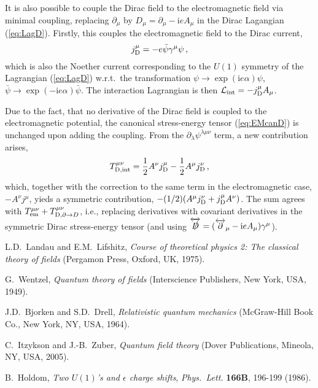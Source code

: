 \documentclass[a4paper,12pt]{article}
\def\imagi{\mathrm{i}}
\def\lag{{\mathcal{L}}}
\begin{document}
It is also possible to couple the Dirac field to the electromagnetic field via minimal coupling, replacing $\partial_\mu$ by $D_\mu = \partial_\mu -\imagi e A_\mu$ in the Dirac Lagangian (\ref{eq:LagD}). Firstly, this couples the electromagnetic field to the Dirac current,
\begin{equation}
j^\mu_{\rm D} = -e \bar{\psi}\gamma^\mu \psi\,,
\end{equation}
which is also the Noether current corresponding to the $U(1)$ symmetry of the Lagrangian (\ref{eq:LagD}) w.r.t.\ the transformation $\psi \to \exp(\imagi e \alpha)\psi$, $\bar\psi \to \exp(-\imagi e \alpha)\bar\psi$.
The interaction Lagrangian is then $\lag_{\rm int} = -j^\mu_{\rm D}A_\mu$.

Due to the fact, that no derivative of the Dirac field is coupled to the electromagnetic potential, the canonical stress-energy tensor (\ref{eq:EMcanD}) is unchanged upon adding the coupling. From the $\partial_\lambda \psi^{\lambda\mu\nu}$ term, a new contribution arises,
\[
 T^{\mu\nu}_{\rm D,int} = \frac{1}{2}A^\nu j^\mu_{\rm D}-\frac{1}{2}A^{\mu}j^\nu_{\rm D}\,,
\]
which, together with the correction to the same term in the electromagnetic case, $-A^\nu j^\mu$, yieds a symmetric contribution, $-(1/2)(A^\mu j^\nu_{\rm D} + j^\mu_{\rm D}A^\nu)$. The sum agrees with $T^{\mu\nu}_{\rm em}+T^{\mu\nu}_{{\rm D},\partial\to D}$, i.e., replacing derivatives with covariant derivatives in the symmetric Dirac stress-energy tensor (and using $\overleftrightarrow{\slashed{D}} = (\overleftrightarrow{\partial}_\mu -\imagi e A_\mu)\gamma^\mu$).










\begin{thebibliography}{99}
 L.D.~Landau and E.M.~Lifshitz, \emph{Course of theoretical physics 2: The classical theory of fields} (Pergamon Press, Oxford, UK, 1975).

 G.~Wentzel, \emph{Quantum theory of fields} (Interscience Publishers, New York, USA, 1949).

 J.D.~Bjorken and S.D.~Drell, \emph{Relativistic quantum mechanics} (McGraw-Hill Book Co., New York, NY, USA, 1964).

 C.~Itzykson and J.-B.~Zuber, \emph{Quantum field theory} (Dover Publications, Mineola, NY, USA, 2005).

 B.~Holdom, \emph{Two $U(1)$'s and $\epsilon$ charge shifts}, {\sl Phys.\ Lett.} {\bf 166B}, 196-199 (1986).

\end{thebibliography}
\end{document}
